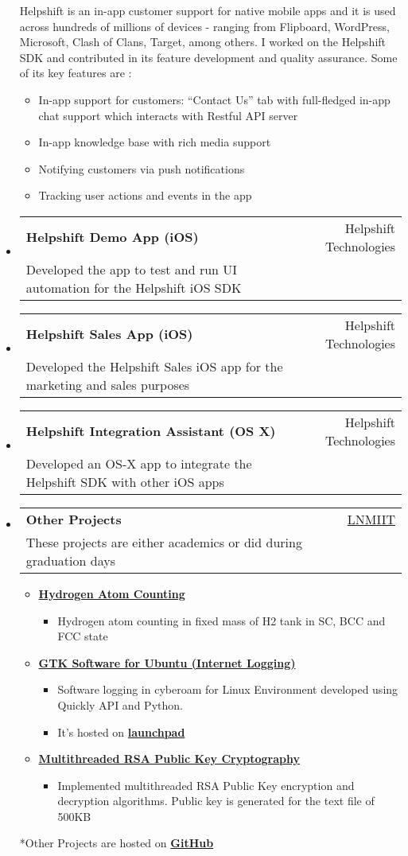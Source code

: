 \documentclass[letterpaper,11pt]{article}
\makeatletter
\newcommand{\resitem}[1]{\item #1 \vspace{-2pt}}
\newcommand{\ressubheading}[3]{
\begin{tabular*}{6.5in}{l@{\extracolsep{\fill}}r}
	\textbf{#1} & #2\\
	{#3} \\
\end{tabular*}\vspace{-6pt}
}
\makeatother
\begin{document}
\begin{itemize}
			{\small Helpshift is an in-app customer support for native mobile apps and it is used across hundreds of millions of devices - ranging from Flipboard, WordPress, Microsoft, Clash of Clans, Target, among others. I worked on the Helpshift SDK and contributed in its feature development and quality assurance. Some of its key features are :}
		{ \footnotesize
		\begin{itemize}
			\resitem{In-app support for customers: “Contact Us” tab with full-fledged in-app chat support which interacts with Restful API server}
			\resitem{In-app knowledge base with rich media support}
			\resitem{Notifying customers via push notifications}
			\resitem{Tracking user actions and events in the app}
		\end{itemize}
		}
   \item
	\ressubheading{Helpshift Demo App (iOS)}{Helpshift Technologies}{Developed the app to test and run UI automation for the Helpshift iOS SDK}	
   \item
	\ressubheading{Helpshift Sales App (iOS)}{Helpshift Technologies}{Developed the Helpshift Sales iOS app for the marketing and sales purposes}
\item
	\ressubheading{Helpshift Integration Assistant (OS X)}{Helpshift Technologies}{Developed an OS-X app to integrate the Helpshift SDK with other iOS apps}
\item
	\ressubheading{Other Projects}{\href{http://www.lnmiit.ac.in/}{LNMIIT}}{These projects are either academics or did during graduation days}
	{ \footnotesize
		\begin{itemize}
			\resitem{\href{https://github.com/xpd54/Hydrogen-atom-counting}{\textbf {Hydrogen Atom Counting}}}
				\begin{itemize}
					\resitem {Hydrogen atom counting in fixed mass of H2 tank in SC, BCC and FCC state}
				\end{itemize}
			\resitem{\href{https://github.com/xpd54/cyberoam-login}{\textbf {GTK Software for Ubuntu (Internet Logging)}}}
			    \begin{itemize}
					\resitem {Software logging in cyberoam for Linux Environment developed using Quickly API and Python.}
			       \resitem {It's hosted on \href{https://launchpad.net/~vickyravi17/+archive/ubuntu/xpd54-cyberoam}{\textbf{launchpad}}}
			    \end{itemize}
			\resitem{\href{https://github.com/xpd54/RsaOnMultithreading}{\textbf {Multithreaded RSA Public Key Cryptography}}}
				\begin{itemize}
					\resitem {Implemented multithreaded RSA Public Key encryption and decryption algorithms. Public key is generated for the text file of 500KB}
				\end{itemize}
		\end{itemize}
		{\tiny **Other Projects are hosted on \href{http://www.github.com/xpd54}{\textbf{GitHub}}}
	}
\end{itemize}  %
\end{document}
